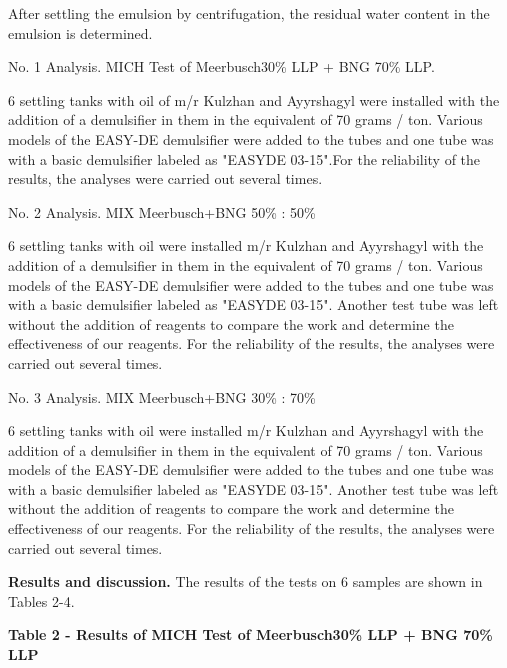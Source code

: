 \begin{multicols}{2}
After settling the emulsion by centrifugation, the residual water
content in the emulsion is determined.

No. 1 Analysis. MICH Test of Meerbusch30\% LLP + BNG 70\% LLP.

6 settling tanks with oil of m/r Kulzhan and Ayyrshagyl were installed
with the addition of a demulsifier in them in the equivalent of 70 grams
/ ton. Various models of the EASY-DE demulsifier were added to the tubes
and one tube was with a basic demulsifier labeled as "EASYDE 03-15".For
the reliability of the results, the analyses were carried out several
times.

No. 2 Analysis. MIX Meerbusch+BNG 50\% : 50\%

6 settling tanks with oil were installed m/r Kulzhan and Ayyrshagyl with
the addition of a demulsifier in them in the equivalent of 70 grams /
ton. Various models of the EASY-DE demulsifier were added to the tubes
and one tube was with a basic demulsifier labeled as "EASYDE 03-15".
Another test tube was left without the addition of reagents to compare
the work and determine the effectiveness of our reagents. For the
reliability of the results, the analyses were carried out several times.

No. 3 Analysis. MIX Meerbusch+BNG 30\% : 70\%

6 settling tanks with oil were installed m/r Kulzhan and Ayyrshagyl with
the addition of a demulsifier in them in the equivalent of 70 grams /
ton. Various models of the EASY-DE demulsifier were added to the tubes
and one tube was with a basic demulsifier labeled as "EASYDE 03-15".
Another test tube was left without the addition of reagents to compare
the work and determine the effectiveness of our reagents. For the
reliability of the results, the analyses were carried out several times.

{\bfseries Results and discussion.} The results of the tests on 6 samples
are shown in Tables 2-4.
\end{multicols}

{\bfseries Table 2 - Results of MICH Test of Meerbusch30\% LLP + BNG 70\%
LLP}

